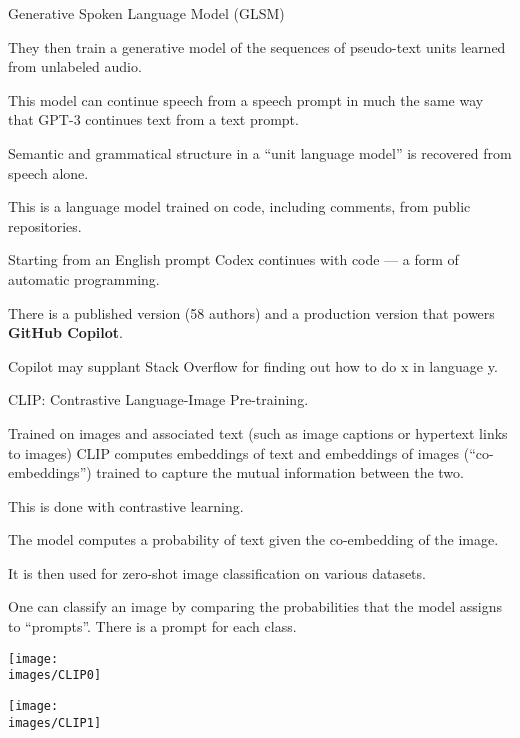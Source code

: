 {

Generative Spoken Language Model (GLSM)

\vfill
They then train a generative model of the sequences of pseudo-text units learned from unlabeled audio.


\vfill
This model can continue speech from a speech prompt in much the same way that GPT-3 continues text from a text prompt.

\vfill
Semantic and grammatical structure in a ``unit language model'' is recovered
from speech alone.


This is a language model trained on code, including comments, from public repositories.

\vfill
Starting from an English prompt Codex continues with code --- a form of automatic programming.

\vfill
There is a published version (58 authors) and a production version that powers {\bf GitHub Copilot}.

\vfill
Copilot may supplant Stack Overflow for finding out how to do x in language y.


CLIP: Contrastive Language-Image Pre-training.

\vfill
Trained on images and associated text (such as image captions or hypertext links to images) CLIP computes embeddings of text and embeddings of images
(``co-embeddings'') trained to capture the mutual information between the two.

\vfill
This is done with contrastive learning.


The model computes a probability of text given the co-embedding of the image.

\vfill
It is then used for zero-shot image classification on various datasets.

\vfill
One can classify an image by comparing the probabilities that the model assigns to ``prompts''.  There is a prompt for each class.


\centerline{\texttt{[image: \\images/CLIP0]}}


\centerline{\texttt{[image: \\images/CLIP1]}}

}
